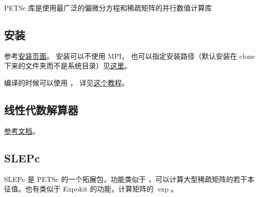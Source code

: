 
\begin{issues}
\issueDraft
\end{issues}

PETSc 库是使用最广泛的偏微分方程和稀疏矩阵的并行数值计算库

\subsection{安装}
参考\href{https://petsc.org/release/install/install_tutorial/}{安装页面}。
安装可以不使用 MPI， 也可以指定安装路径（默认安装在 clone 下来的文件夹而不是系统目录）见\href{https://petsc.org/release/install/install/#mpi-problems-i-don-t-want-mpi}{这里}。

编译的时候可以使用 ， 详见\href{https://www.intel.com/content/www/us/en/developer/articles/technical/mkl-blas-lapack-with-petsc.html}{这个教程}。

\subsection{线性代数解算器}
\href{https://petsc.org/release/docs/manual/ksp/}{参考文档}。

\subsection{SLEPc}
SLEPc 是 PETSc 的一个拓展包，功能类似于 ，可以计算大型稀疏矩阵的若干本征值。也有类似于 Expokit 的功能，计算矩阵的 $\exp$。
